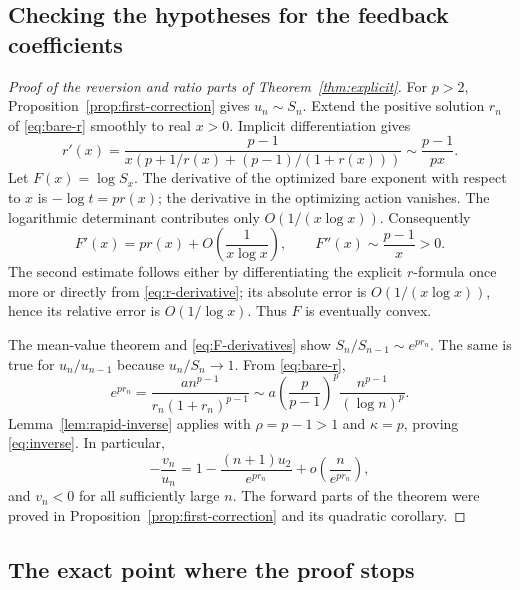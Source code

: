 \documentclass[11pt,a4paper]{article}
\numberwithin{equation}{section}
\theoremstyle{definition}
\theoremstyle{remark}
\begin{document}
\subsection{Checking the hypotheses for the feedback coefficients}

\begin{proof}[Proof of the reversion and ratio parts of Theorem~\ref{thm:explicit}]
For $p>2$, Proposition~\ref{prop:first-correction} gives $u_n\sim S_n$.
Extend the positive solution $r_n$ of \eqref{eq:bare-r} smoothly to real
$x>0$. Implicit differentiation gives
\begin{equation}
 r'(x)=\frac{p-1}
 {x\left(p+1/r(x)+(p-1)/(1+r(x))\right)}
 \sim\frac{p-1}{px}.
 \label{eq:r-derivative}
\end{equation}
Let $F(x)=\log S_x$. The derivative of the optimized bare exponent with
respect to $x$ is $-\log t=pr(x)$; the derivative in the optimizing
action vanishes. The logarithmic determinant contributes only
$O(1/(x\log x))$. Consequently
\begin{equation}
 F'(x)=pr(x)+O\!\left(\frac1{x\log x}\right),\qquad
 F''(x)\sim\frac{p-1}{x}>0.
 \label{eq:F-derivatives}
\end{equation}
The second estimate follows either by differentiating the explicit
$r$-formula once more or directly from \eqref{eq:r-derivative}; its absolute error
is $O(1/(x\log x))$, hence its relative error is $O(1/\log x)$.
Thus $F$ is eventually convex.

The mean-value theorem and \eqref{eq:F-derivatives} show
$S_n/S_{n-1}\sim e^{pr_n}$. The same is true for $u_n/u_{n-1}$ because
$u_n/S_n\to1$. From \eqref{eq:bare-r},
\begin{equation}
 e^{pr_n}
 =\frac{a n^{p-1}}{r_n(1+r_n)^{p-1}}
 \sim a\left(\frac p{p-1}\right)^p
       \frac{n^{p-1}}{(\log n)^p}.
 \label{eq:rapid-ratio-scale}
\end{equation}
Lemma~\ref{lem:rapid-inverse} applies with $\rho=p-1>1$ and
$\kappa=p$, proving \eqref{eq:inverse}. In particular,
\begin{equation}
 -\frac{v_n}{u_n}
 =1-\frac{(n+1)u_2}{e^{pr_n}}
       +o\!\left(\frac n{e^{pr_n}}\right),
 \label{eq:inverse-relative}
\end{equation}
and $v_n<0$ for all sufficiently large $n$.
The forward parts of the theorem were proved in
Proposition~\ref{prop:first-correction} and its quadratic corollary.
\end{proof}

\subsection{The exact point where the proof stops}
\end{document}
